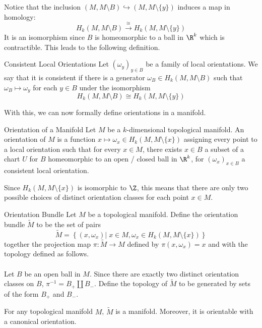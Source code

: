 \documentclass[a4paper]{article}
\begin{document}
Notice that the inclusion $(M,M\setminus B)\hookrightarrow(M,M\setminus\{y\})$ induces a map in homology: $$H_k(M,M\setminus B)\overset{\cong}{\rightarrow}H_k(M,M\setminus\{y\})$$ It is an isomorphism since $B$ is homeomorphic to a ball in $\R^k$ which is contractible. This leads to the following definition. 

\begin{defn}{Consistent Local Orientations}{} Let $(\omega_y)_{y\in B}$ be a family of local orientations. We say that it is consistent if there is a generator $\omega_B\in H_k(M,M\setminus B)$ such that $\omega_B\mapsto\omega_y$ for each $y\in B$ under the isomorphism $$H_k(M,M\setminus B)\cong H_k(M,M\setminus\{y\})$$
\end{defn}

With this, we can now formally define orientations in a manifold. 

\begin{defn}{Orientation of a Manifold}{} Let $M$ be a $k$-dimensional topological manifold. An orientation of $M$ is a function $x\mapsto\omega_x\in H_k(M,M\setminus\{x\})$ assigning every point to a local orientation such that for every $x\in M$, there exists $x\in B$ a subset of a chart $U$ for $B$ homeomorphic to an open / closed ball in $\R^k$, for $(\omega_x)_{x\in B}$ a consistent local orientation. 
\end{defn}

Since $H_k(M,M\setminus\{x\})$ is isomorphic to $\Z$, this means that there are only two possible choices of distinct orientation classes for each point $x\in M$. 

\begin{defn}{Orientation Bundle}{} Let $M$ be a topological manifold. Define the orientation bundle $\widetilde{M}$ to be the set of pairs $$\widetilde{M}=\left\{(x,\omega_x)|\; x\in M, \omega_x\in H_k(M,M\setminus\{x\})\right\}$$ together the projection map $\pi:\widetilde{M}\to M$ defined by $\pi(x,\omega_x)=x$ and with the topology defined as follows. \\~\\

Let $B$ be an open ball in $M$. Since there are exactly two distinct orientation classes on $B$, $\pi^{-1}=B_+\amalg B_-$. Define the topology of $\widetilde{M}$ to be generated by sets of the form $B_+$ and $B_-$. 
\end{defn}

\begin{lmm}{}{} For any topological manifold $M$, $\widetilde{M}$ is a manifold. Moreover, it is orientable with a canonical orientation. 
\end{lmm}
\end{document}
